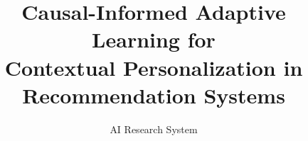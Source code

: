 \documentclass{article} %
\title{Causal-Informed Adaptive Learning for \\Contextual Personalization in \\Recommendation Systems}
\author{AI Research System}
\begin{document}
\maketitle

\begin{abstract}

\end{abstract}


















\end{document}

